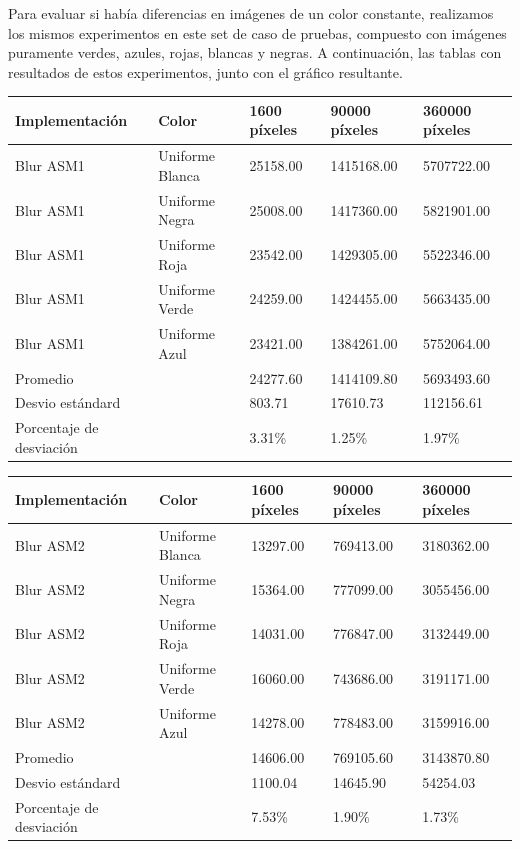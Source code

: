 Para evaluar si había diferencias en imágenes de un color constante, realizamos los mismos experimentos en este set de caso de pruebas, compuesto con imágenes puramente verdes, azules, rojas, blancas y negras. A continuación, las tablas con resultados de estos experimentos, junto con el gráfico resultante.\\

\begin{tabular}{| l | l | l | l | l |}
\hline
Implementación & Color & 1600 píxeles & 90000 píxeles & 360000 píxeles\\
\hline
Blur ASM1 & Uniforme Blanca & 25158.00 & 1415168.00 & 5707722.00\\ 
\hline
Blur ASM1 & Uniforme Negra & 25008.00 & 1417360.00 & 5821901.00\\ 
\hline
Blur ASM1 & Uniforme Roja & 23542.00 & 1429305.00 & 5522346.00\\ 
\hline
Blur ASM1 & Uniforme Verde & 24259.00 & 1424455.00 & 5663435.00\\
\hline
Blur ASM1 & Uniforme Azul & 23421.00 & 1384261.00 & 5752064.00\\
\hline
Promedio & &  24277.60 & 1414109.80 & 5693493.60\\
\hline
Desvio estándard  &&  803.71 & 17610.73 & 112156.61\\
\hline
Porcentaje de desviación  &&  3.31\% & 1.25\% & 1.97\%\\
\hline
\end{tabular}


\begin{tabular}{| l | l | l | l | l |}
\hline
Implementación & Color & 1600 píxeles & 90000 píxeles & 360000 píxeles\\
\hline
Blur ASM2 & Uniforme Blanca & 13297.00 & 769413.00 & 3180362.00\\ 
\hline
Blur ASM2 & Uniforme Negra & 15364.00 & 777099.00 & 3055456.00\\ 
\hline
Blur ASM2 & Uniforme Roja & 14031.00 & 776847.00 & 3132449.00\\ 
\hline
Blur ASM2 & Uniforme Verde & 16060.00 & 743686.00 & 3191171.00\\
\hline
Blur ASM2 & Uniforme Azul & 14278.00 & 778483.00 & 3159916.00\\
\hline
Promedio & &   14606.00 & 769105.60 & 3143870.80\\
\hline
Desvio estándard  &&  1100.04 & 14645.90 & 54254.03\\
\hline
Porcentaje de desviación  &&   7.53\% & 1.90\% & 1.73\%\\
\hline
\end{tabular}

